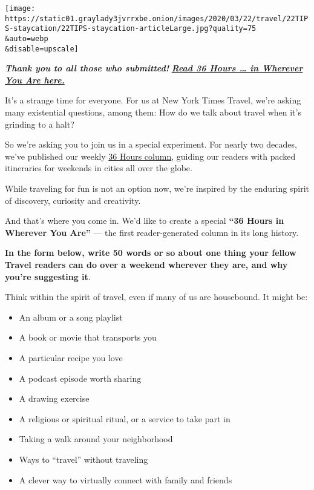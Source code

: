 \texttt{[image: https://static01.graylady3jvrrxbe.onion/images/2020/03/22/travel/22TIPS-staycation/22TIPS-staycation-articleLarge.jpg?quality=75\\\&auto=webp\\\&disable=upscale]}

\emph{\textbf{Thank you to all those who submitted!}}
\textbf{\href{https://www.nytimes3xbfgragh.onion/2020/04/02/travel/36-hours-quarantine.html}{\emph{Read
36 Hours \ldots{} in Wherever You Are here.}}}

It's a strange time for everyone. For us at New York Times Travel, we're
asking many existential questions, among them: How do we talk about
travel when it's grinding to a halt?

So we're asking you to join us in a special experiment. For nearly two
decades, we've published our weekly
\href{https://www.nytimes3xbfgragh.onion/column/36-hours}{36 Hours
column}, guiding our readers with packed itineraries for weekends in
cities all over the globe.

While traveling for fun is not an option now, we're inspired by the
enduring spirit of discovery, curiosity and creativity.

And that's where you come in. We'd like to create a special \textbf{``36
Hours in Wherever You Are''} --- the first reader-generated column in
its long history.

\textbf{In the form below, write 50 words or so about one thing your
fellow Travel readers can do over a weekend wherever they are, and why
you're suggesting it}.

Think within the spirit of travel, even if many of us are housebound. It
might be:

\begin{itemize}
\item
  An album or a song playlist
\item
  A book or movie that transports you
\item
  A particular recipe you love
\item
  A podcast episode worth sharing
\item
  A drawing exercise
\item
  A religious or spiritual ritual, or a service to take part in
\item
  Taking a walk around your neighborhood
\item
  Ways to ``travel'' without traveling
\item
  A clever way to virtually connect with family and friends
\end{itemize}

